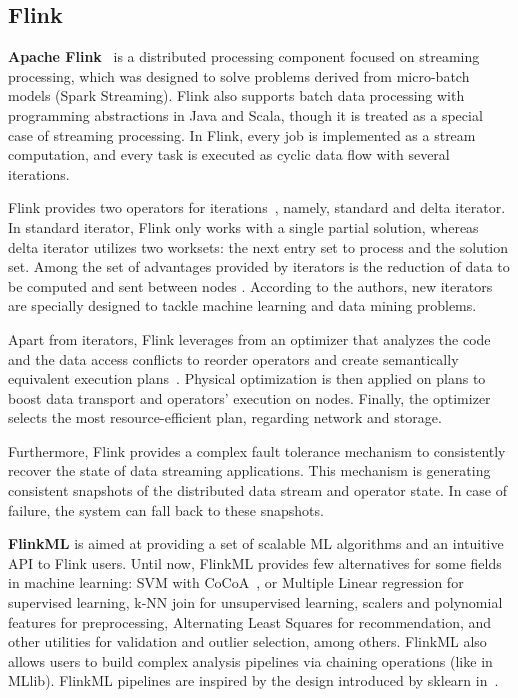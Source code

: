 \documentclass[3p,review]{elsarticle}
\begin{document}
	\subsection{Flink}\label{subsec:flink}
	
	\textbf{Apache Flink}~\cite{flink} is a distributed processing component focused on streaming processing, which was designed to solve problems derived from micro-batch models (Spark Streaming). Flink also supports batch data processing with programming abstractions in Java and Scala, though it is treated as a special case of streaming processing. In Flink, every job is implemented as a stream computation, and every task is executed as cyclic data flow with several iterations. 
	
	Flink provides two operators for iterations~\cite{flinkengine}, namely, standard and delta iterator. In standard iterator, Flink only works with a single partial solution, whereas delta iterator utilizes two worksets: the next entry set to process and the solution set.
	Among the set of advantages provided by iterators is the reduction of data to be computed and sent between nodes \cite{EwenTKM12}. According to the authors, new iterators are specially designed to tackle machine learning and data mining problems.
	
	Apart from iterators, Flink leverages from an optimizer that analyzes the code and the data access conflicts to reorder operators and create semantically equivalent execution plans~\cite{Alexandrov14,Hues12}. Physical optimization is then applied on plans to boost data transport and operators' execution on nodes. Finally, the optimizer selects the most resource-efficient plan, regarding network and storage.
	
	Furthermore, Flink provides a complex fault tolerance mechanism to consistently recover the state of data streaming applications. This mechanism is generating consistent snapshots of the distributed data stream and operator state. In case of failure, the system can fall back to these snapshots.
	
	\textbf{FlinkML} is aimed at providing a set of scalable ML algorithms and an intuitive API to Flink users. Until now, FlinkML provides few alternatives for some fields in machine learning: SVM with CoCoA~\cite{jaggi14}, or Multiple Linear regression for supervised learning, k-NN join for unsupervised learning, scalers and polynomial features for preprocessing, Alternating Least Squares for recommendation, and other utilities for validation and outlier selection, among others. FlinkML also allows users to build complex analysis pipelines via chaining operations (like in MLlib). FlinkML pipelines are inspired by the design introduced by sklearn in~\cite{buitin13}.
	
\end{document}
